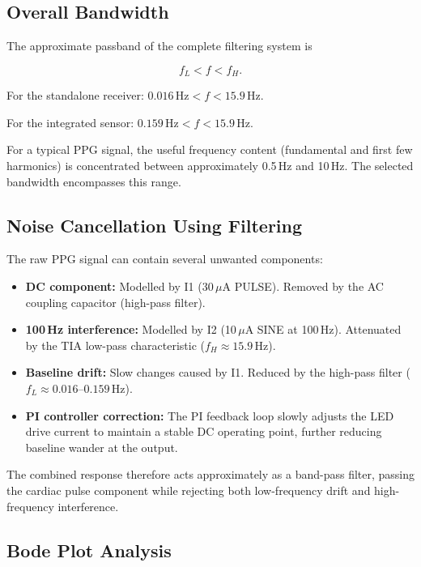 \documentclass[10pt]{article}
\begin{document}
\subsection{Overall Bandwidth}

The approximate passband of the complete filtering system is

\begin{equation}
f_L < f < f_H.
\end{equation}

For the standalone receiver: $0.016\,\mathrm{Hz} < f < 15.9\,\mathrm{Hz}$.

For the integrated sensor: $0.159\,\mathrm{Hz} < f < 15.9\,\mathrm{Hz}$.

For a typical PPG signal, the useful frequency content (fundamental and first few harmonics) is concentrated between approximately 0.5\,Hz and 10\,Hz. The selected bandwidth encompasses this range.

\subsection{Noise Cancellation Using Filtering}

The raw PPG signal can contain several unwanted components:

\begin{itemize}
    \item \textbf{DC component:} Modelled by I1 (30\,$\mu$A PULSE). Removed by the AC coupling capacitor (high-pass filter).
    \item \textbf{100\,Hz interference:} Modelled by I2 (10\,$\mu$A SINE at 100\,Hz). Attenuated by the TIA low-pass characteristic ($f_H \approx 15.9$\,Hz).
    \item \textbf{Baseline drift:} Slow changes caused by I1. Reduced by the high-pass filter ($f_L \approx 0.016$--$0.159$\,Hz).
    \item \textbf{PI controller correction:} The PI feedback loop slowly adjusts the LED drive current to maintain a stable DC operating point, further reducing baseline wander at the output.
\end{itemize}

The combined response therefore acts approximately as a band-pass filter, passing the cardiac pulse component while rejecting both low-frequency drift and high-frequency interference.

\subsection{Bode Plot Analysis}
\end{document}
